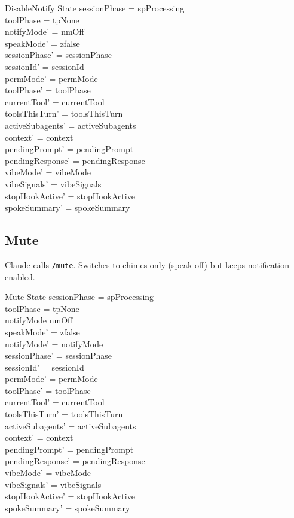 \documentclass[a4paper,10pt,fleqn]{article}
\begin{document}
\begin{schema}{DisableNotify}
  \Delta State
  \where
  sessionPhase = spProcessing \\
  toolPhase = tpNone \\
  notifyMode' = nmOff \\
  speakMode' = zfalse \\
  sessionPhase' = sessionPhase \\
  sessionId' = sessionId \\
  permMode' = permMode \\
  toolPhase' = toolPhase \\
  currentTool' = currentTool \\
  toolsThisTurn' = toolsThisTurn \\
  activeSubagents' = activeSubagents \\
  context' = context \\
  pendingPrompt' = pendingPrompt \\
  pendingResponse' = pendingResponse \\
  vibeMode' = vibeMode \\
  vibeSignals' = vibeSignals \\
  stopHookActive' = stopHookActive \\
  spokeSummary' = spokeSummary
\end{schema}

\subsection{Mute}

Claude calls \texttt{/mute}. Switches to chimes only (speak off)
but keeps notification enabled.

\begin{schema}{Mute}
  \Delta State
  \where
  sessionPhase = spProcessing \\
  toolPhase = tpNone \\
  notifyMode \neq nmOff \\
  speakMode' = zfalse \\
  notifyMode' = notifyMode \\
  sessionPhase' = sessionPhase \\
  sessionId' = sessionId \\
  permMode' = permMode \\
  toolPhase' = toolPhase \\
  currentTool' = currentTool \\
  toolsThisTurn' = toolsThisTurn \\
  activeSubagents' = activeSubagents \\
  context' = context \\
  pendingPrompt' = pendingPrompt \\
  pendingResponse' = pendingResponse \\
  vibeMode' = vibeMode \\
  vibeSignals' = vibeSignals \\
  stopHookActive' = stopHookActive \\
  spokeSummary' = spokeSummary
\end{schema}
\end{document}

